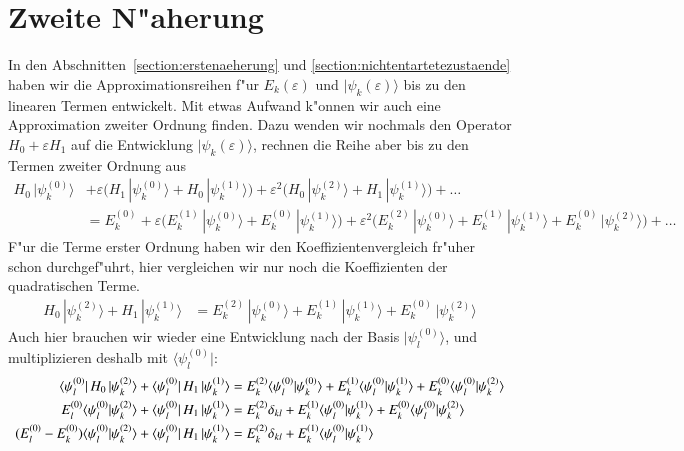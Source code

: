 \section{Zweite N"aherung}
In den Abschnitten~\ref{section:erstenaeherung} und
\ref{section:nichtentartetezustaende} haben wir die Approximationsreihen
f"ur $E_k(\varepsilon)$ und $|\psi_k(\varepsilon)\rangle$
bis zu den linearen Termen entwickelt.
Mit etwas Aufwand k"onnen wir auch eine Approximation zweiter Ordnung
finden.
Dazu wenden wir nochmals den Operator $H_0+\varepsilon H_1$
auf die Entwicklung $|\psi_k(\varepsilon)\rangle$, rechnen die Reihe aber bis
zu den Termen zweiter Ordnung aus
\begin{align*}
H_0\,|\psi_k^{(0)}\rangle
&+
\varepsilon
\bigl(
H_1\,|\psi_k^{(0)}\rangle
+
H_0\,|\psi_k^{(1)}\rangle
\bigr)
+
\varepsilon^2
\bigl(
H_0\,|\psi_k^{(2)}\rangle
+
H_1\,|\psi_k^{(1)}\rangle
\bigr)
+
\dots
\\
&=
E_k^{(0)}
+
\varepsilon
\bigl(
E_k^{(1)}\,|\psi_k^{(0)}\rangle
+
E_k^{(0)}\,|\psi_k^{(1)}\rangle
\bigr)
+
\varepsilon^2
\bigl(
E_k^{(2)}\,|\psi_k^{(0)}\rangle
+
E_k^{(1)}\,|\psi_k^{(1)}\rangle
+
E_k^{(0)}\,|\psi_k^{(2)}\rangle
\bigr)
+
\dots
\end{align*}
F"ur die Terme erster Ordnung haben wir den Koeffizientenvergleich
fr"uher schon durchgef"uhrt, hier vergleichen wir nur noch die
Koeffizienten der quadratischen Terme.
\begin{align*}
H_0\,|\psi_k^{(2)}\rangle
+
H_1\,|\psi_k^{(1)}\rangle
&=
E_k^{(2)}\,|\psi_k^{(0)}\rangle
+
E_k^{(1)}\,|\psi_k^{(1)}\rangle
+
E_k^{(0)}\,|\psi_k^{(2)}\rangle
\end{align*}
Auch hier brauchen wir wieder eine Entwicklung nach der Basis
$|\psi_l^{(0)}\rangle$, und multiplizieren deshalb mit
$\langle\psi_l^{(0)}|$:
\begin{align}
\langle\psi_l^{(0)}|\,H_0\,|\psi_k^{(2)}\rangle
+
\langle\psi_l^{(0)}|\,H_1\,|\psi_k^{(1)}\rangle
&=
E_k^{(2)}\langle\psi_l^{(0)}|\psi_k^{(0)}\rangle
+
E_k^{(1)}\langle\psi_l^{(0)}|\psi_k^{(1)}\rangle
+
E_k^{(0)}\langle\psi_l^{(0)}|\psi_k^{(2)}\rangle
\notag
\\
E_l^{(0)}\langle\psi_l^{(0)}|\psi_k^{(2)}\rangle
+
\langle\psi_l^{(0)}|\,H_1\,|\psi_k^{(1)}\rangle
&=
E_k^{(2)}\delta_{kl}
+
E_k^{(1)}\langle\psi_l^{(0)}|\psi_k^{(1)}\rangle
+
E_k^{(0)}\langle\psi_l^{(0)}|\psi_k^{(2)}\rangle
\notag
\\
(E_l^{(0)}-E_k^{(0)})\langle\psi_l^{(0)}|\psi_k^{(2)}\rangle
+
\langle\psi_l^{(0)}|\,H_1\,|\psi_k^{(1)}\rangle
&=
E_k^{(2)}\delta_{kl}
+
E_k^{(1)}\langle\psi_l^{(0)}|\psi_k^{(1)}\rangle
\label{skript:zweitenaeherung}
\end{align}
